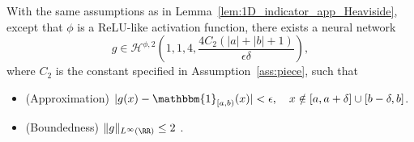 \documentclass[11pt]{article}
\begin{document}
\begin{lemma}
    With the same assumptions as in Lemma~\ref{lem:1D_indicator_app_Heaviside}, except that $\phi$ is a ReLU-like activation function, there exists a neural network
    \begin{equation*}
        g \in  \mathcal{H}^{\phi,2}\left(1, 1, 4,  \frac{4C_2 (|a|+|b|+1)}{\epsilon \delta} \right),
    \end{equation*}
    where $C_2$ is the constant specified in Assumption~\ref{ass:piece}, such that
    \begin{itemize}
        \item (Approximation) $|g(x) - \mathbbm{1}_{[a,b)} (x)| < \epsilon, \quad x \notin [a,a+\delta] \cup [b-\delta,b]$.
        \item (Boundedness) $\|g\|_{L^{\infty}(\RR)} \leq 2$ .
    \end{itemize}
    \label{lem:1D_indicator_app_ReLU}
\end{lemma}
\end{document}
